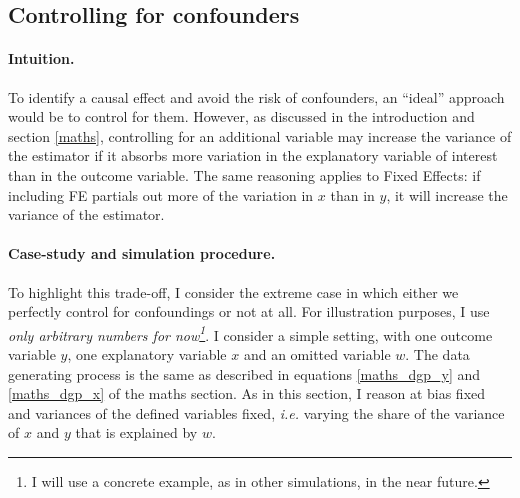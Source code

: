 \documentclass[usletter, 12pt]{article}
\begin{document}
		
		
		 \subsection{Controlling for confounders}
		
     			\paragraph{Intuition.} To identify a causal effect and avoid the risk of confounders, an ``ideal'' approach would be to control for them. %
			However, as discussed in the introduction and section \ref{maths}, controlling for an additional variable may increase the variance of the estimator if it absorbs more variation in the explanatory variable of interest than in the outcome variable.
			The same reasoning applies to Fixed Effects: if including FE partials out more of the variation in $x$ than in $y$, it will increase the variance of the estimator.
			
			\paragraph{Case-study and simulation procedure.} To highlight this trade-off, I consider the extreme case in which either we perfectly control for confoundings or not at all. For illustration purposes, I use \textit{only arbitrary numbers for now\footnote{I will use a concrete example, as in other simulations, in the near future.}}. I consider a simple setting, with one outcome variable $y$, one explanatory variable $x$ and an omitted variable $w$. The data generating process is the same as described in equations \ref{maths_dgp_y} and \ref{maths_dgp_x} of the maths section. As in this section, I reason at bias fixed and variances of the defined variables fixed, \textit{i.e.} varying the share of the variance of $x$ and $y$ that is explained by $w$.
			
\end{document}

